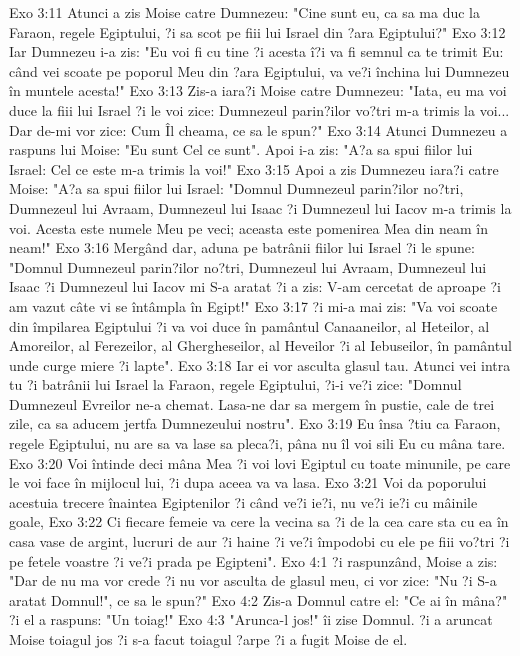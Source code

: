 Exo 3:11  Atunci a zis Moise catre Dumnezeu: "Cine sunt eu, ca sa ma duc la Faraon, regele Egiptului, ?i sa scot pe fiii lui Israel din ?ara Egiptului?"
Exo 3:12  Iar Dumnezeu i-a zis: "Eu voi fi cu tine ?i acesta î?i va fi semnul ca te trimit Eu: când vei scoate pe poporul Meu din ?ara Egiptului, va ve?i închina lui Dumnezeu în muntele acesta!"
Exo 3:13  Zis-a iara?i Moise catre Dumnezeu: "Iata, eu ma voi duce la fiii lui Israel ?i le voi zice: Dumnezeul parin?ilor vo?tri m-a trimis la voi... Dar de-mi vor zice: Cum Îl cheama, ce sa le spun?"
Exo 3:14  Atunci Dumnezeu a raspuns lui Moise: "Eu sunt Cel ce sunt". Apoi i-a zis: "A?a sa spui fiilor lui Israel: Cel ce este m-a trimis la voi!"
Exo 3:15  Apoi a zis Dumnezeu iara?i catre Moise: "A?a sa spui fiilor lui Israel: "Domnul Dumnezeul parin?ilor no?tri, Dumnezeul lui Avraam, Dumnezeul lui Isaac ?i Dumnezeul lui Iacov m-a trimis la voi. Acesta este numele Meu pe veci; aceasta este pomenirea Mea din neam în neam!"
Exo 3:16  Mergând dar, aduna pe batrânii fiilor lui Israel ?i le spune: "Domnul Dumnezeul parin?ilor no?tri, Dumnezeul lui Avraam, Dumnezeul lui Isaac ?i Dumnezeul lui Iacov mi S-a aratat ?i a zis: V-am cercetat de aproape ?i am vazut câte vi se întâmpla în Egipt!"
Exo 3:17  ?i mi-a mai zis: "Va voi scoate din împilarea Egiptului ?i va voi duce în pamântul Canaaneilor, al Heteilor, al Amoreilor, al Ferezeilor, al Ghergheseilor, al Heveilor ?i al Iebuseilor, în pamântul unde curge miere ?i lapte".
Exo 3:18  Iar ei vor asculta glasul tau. Atunci vei intra tu ?i batrânii lui Israel la Faraon, regele Egiptului, ?i-i ve?i zice: "Domnul Dumnezeul Evreilor ne-a chemat. Lasa-ne dar sa mergem în pustie, cale de trei zile, ca sa aducem jertfa Dumnezeului nostru".
Exo 3:19  Eu însa ?tiu ca Faraon, regele Egiptului, nu are sa va lase sa pleca?i, pâna nu îl voi sili Eu cu mâna tare.
Exo 3:20  Voi întinde deci mâna Mea ?i voi lovi Egiptul cu toate minunile, pe care le voi face în mijlocul lui, ?i dupa aceea va va lasa.
Exo 3:21  Voi da poporului acestuia trecere înaintea Egiptenilor ?i când ve?i ie?i, nu ve?i ie?i cu mâinile goale,
Exo 3:22  Ci fiecare femeie va cere la vecina sa ?i de la cea care sta cu ea în casa vase de argint, lucruri de aur ?i haine ?i ve?i împodobi cu ele pe fiii vo?tri ?i pe fetele voastre ?i ve?i prada pe Egipteni".
Exo 4:1  ?i raspunzând, Moise a zis: "Dar de nu ma vor crede ?i nu vor asculta de glasul meu, ci vor zice: "Nu ?i S-a aratat Domnul!", ce sa le spun?"
Exo 4:2  Zis-a Domnul catre el: "Ce ai în mâna?" ?i el a raspuns: "Un toiag!"
Exo 4:3  "Arunca-l jos!" îi zise Domnul. ?i a aruncat Moise toiagul jos ?i s-a facut toiagul ?arpe ?i a fugit Moise de el.
